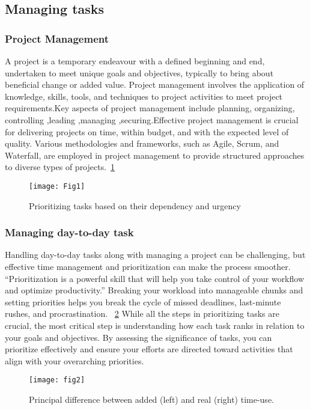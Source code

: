 \documentclass{chart}
\begin{document}
\subsection{Managing  tasks} 

\subsubsection{Project Management}
A project is a temporary endeavour with a defined beginning and end, undertaken to meet unique goals and objectives, typically to bring about beneficial change or added value. Project management involves the application of knowledge, skills, tools, and techniques to project activities to meet project requirements.Key aspects of project management include planning, organizing, controlling ,leading ,managing ,securing.Effective project management is crucial for delivering projects on time, within budget, and with the expected level of quality. Various methodologies and frameworks, such as Agile, Scrum, and Waterfall, are employed in project management to provide structured approaches to diverse types of projects.~\cref{fig:project management} 
 
\begin{figure}
	\centering
	\texttt{[image: Fig1]}
	\caption{Prioritizing tasks based on their dependency and urgency} 
	\label{fig:project management}
\end{figure}

\subsubsection{ Managing day-to-day task}
Handling day-to-day tasks along with managing a project can be challenging, but effective time management and prioritization can make the process smoother. “Prioritization is a powerful skill that will help you take control of your workflow and optimize productivity.” Breaking your workload into manageable chunks and setting priorities helps you break the cycle of missed deadlines, last-minute rushes, and procrastination. ~\cref{fig:task management} While all the steps in prioritizing tasks are crucial, the most critical step is understanding how each task ranks in relation to your goals and objectives. By assessing the significance of tasks, you can prioritize effectively and ensure your efforts are directed toward activities that align with your overarching priorities.
 
\begin{figure}
	\centering
	\texttt{[image: fig2]}
	\caption{Principal difference between added (left) and real (right) time-use.} 
	\label{fig:task management}
\end{figure}
\end{document}
